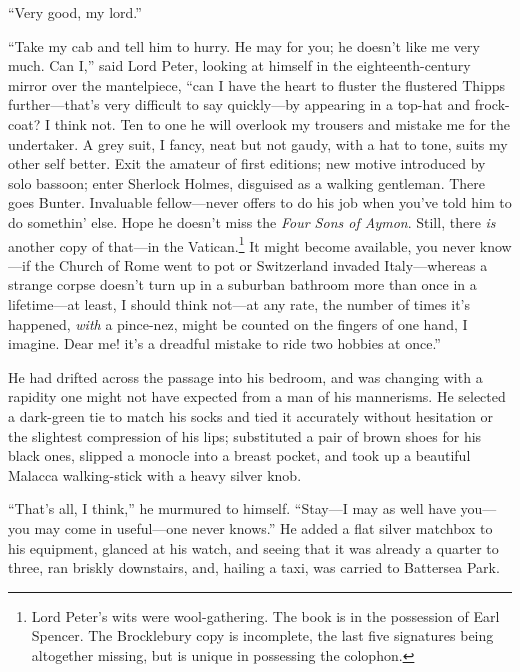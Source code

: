 \enquote{Very good, my lord.}

\enquote{Take my cab and tell him to hurry. He may for you; he doesn’t like me very much. Can I,} said Lord Peter, looking at himself in the eighteenth-century mirror over the mantelpiece, \enquote{can I have the heart to fluster the flustered Thipps further\allowbreak---\allowbreak that’s very difficult to say quickly\allowbreak---\allowbreak by appearing in a top-hat and frock-coat? I think not. Ten to one he will overlook my trousers and mistake me for the undertaker. A grey suit, I fancy, neat but not gaudy, with a hat to tone, suits my other self better. Exit the amateur of first editions; new motive introduced by solo bassoon; enter Sherlock Holmes, disguised as a walking gentleman. There goes Bunter. Invaluable fellow\allowbreak---\allowbreak never offers to do his job when you’ve told him to do somethin’ else. Hope he doesn’t miss the \textit{Four Sons of Aymon}. Still, there \textit{is} another copy of that\allowbreak---\allowbreak in the Vatican.\footnote{Lord Peter’s wits were wool-gathering. The book is in the possession of Earl Spencer. The Brocklebury copy is incomplete, the last five signatures being altogether missing, but is unique in possessing the colophon.} It might become available, you never know\allowbreak---\allowbreak if the Church of Rome went to pot or Switzerland invaded Italy\allowbreak---\allowbreak whereas a strange corpse doesn’t turn up in a suburban bathroom more than once in a lifetime\allowbreak---\allowbreak at least, I should think not\allowbreak---\allowbreak at any rate, the number of times it’s happened, \textit{with} a pince-nez, might be counted on the fingers of one hand, I imagine. Dear me! it’s a dreadful mistake to ride two hobbies at once.}

He had drifted across the passage into his bedroom, and was changing with a rapidity one might not have expected from a man of his mannerisms. He selected a dark-green tie to match his socks and tied it accurately without hesitation or the slightest compression of his lips; substituted a pair of brown shoes for his black ones, slipped a monocle into a breast pocket, and took up a beautiful Malacca walking-stick with a heavy silver knob.

\enquote{That’s all, I think,} he murmured to himself. \enquote{Stay\allowbreak---\allowbreak I may as well have you\allowbreak---\allowbreak you may come in useful\allowbreak---\allowbreak one never knows.} He added a flat silver matchbox to his equipment, glanced at his watch, and seeing that it was already a quarter to three, ran briskly downstairs, and, hailing a taxi, was carried to Battersea Park.


